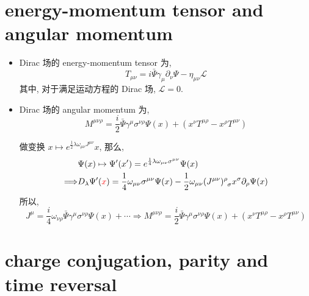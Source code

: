 \section{energy-momentum tensor and angular momentum}
\begin{itemize}
	\item Dirac 场的 energy-momentum tensor 为,
	\begin{equation}
		T_{\mu \nu} = i \bar{\Psi} \gamma_\mu \partial_\nu \Psi - \eta_{\mu \nu} \mathcal{L}
	\end{equation}
	其中, 对于满足运动方程的 Dirac 场, $\mathcal{L} = 0$.
	
	\item  Dirac 场的 angular momentum 为,
	\begin{equation}
		M^{\mu \nu \rho} = \frac{i}{2} \bar{\Psi} \gamma^\mu \sigma^{\nu \rho} \Psi(x) + (x^\nu T^{\mu \rho} - x^\rho T^{\mu \nu})
	\end{equation}
	
	\begin{tcolorbox}[title=calculation:]
		做变换 $x \mapsto e^{\frac{1}{2} \lambda \omega_{\mu \nu} J^{\mu \nu}} x$, 那么,
		\begin{align}
			& \Psi(x) \mapsto \Psi'(x') = e^{\frac{1}{4} \lambda \omega_{\mu \nu} \sigma^{\mu \nu}} \Psi(x) \notag \\
			\Longrightarrow & D_\lambda \Psi'(\mathcolor{red}{x}) = \frac{1}{4} \omega_{\mu \nu} \sigma^{\mu \nu} \Psi(x) - \frac{1}{2} \omega_{\mu \nu} \tensor{(J^{\mu \nu})}{^\rho_\sigma} x^\sigma \partial_\rho \Psi(x)
		\end{align}
		所以,
		\begin{equation}
			J^\mu = \frac{i}{4} \omega_{\nu \rho} \bar{\Psi} \gamma^\mu \sigma^{\nu \rho} \Psi(x) + \cdots \Longrightarrow M^{\mu \nu \rho} = \frac{i}{2} \bar{\Psi} \gamma^\mu \sigma^{\nu \rho} \Psi(x) + (x^\nu T^{\mu \rho} - x^\rho T^{\mu \nu})
		\end{equation}
	\end{tcolorbox}
\end{itemize}

\section{charge conjugation, parity and time reversal}

